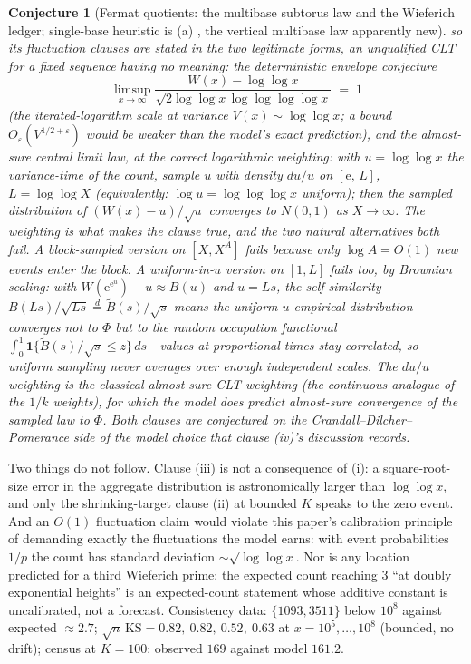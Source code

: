 \documentclass[11pt]{article}
\newtheorem{conjecture}{Conjecture}
\theoremstyle{definition}
\newcommand{\e}{\mathrm{e}}
\begin{document}
\begin{conjecture}[Fermat quotients: the multibase subtorus law and
the Wieferich ledger; single-base heuristic is (a) \cite{CDP}, the
vertical multibase law apparently new]
so its fluctuation clauses are stated in the two legitimate forms,
an unqualified CLT for a fixed sequence having no meaning: the
\emph{deterministic envelope conjecture}
\[
\limsup_{x\to\infty}
\frac{W(x)-\log\log x}
{\sqrt{2\log\log x\,\log\log\log\log x}}\;=\;1
\]
(the iterated-logarithm scale at variance $V(x)\sim\log\log x$; a
bound $O_\varepsilon(V^{1/2+\varepsilon})$ would be weaker than
the model's exact prediction), and the \emph{almost-sure central
limit law, at the correct logarithmic weighting}: with
$u=\log\log x$ the variance-time of the count, sample $u$ with
density $du/u$ on $[\e,\,L]$, $L=\log\log X$ (equivalently: $\log u
=\log\log\log x$ uniform); then the sampled distribution of
$(W(x)-u)/\sqrt u$ converges to $N(0,1)$ as $X\to\infty$.  The
weighting is what makes the clause true, and the two natural
alternatives both fail.  A block-sampled version on $[X,X^A]$
fails because only $\log A=O(1)$ new events enter the block.  A
\emph{uniform}-in-$u$ version on $[1,L]$ fails too, by Brownian
scaling: with
$W(\e^{\e^u})-u\approx B(u)$ and $u=Ls$, the self-similarity
$B(Ls)/\sqrt{Ls}\overset{d}=\widetilde B(s)/\sqrt s$ means the
uniform-$u$ empirical distribution converges not to $\Phi$ but to
the \emph{random} occupation functional
$\int_0^1\mathbf 1\{\widetilde B(s)/\sqrt s\le z\}\,ds$---values at
proportional times stay correlated, so uniform sampling never
averages over enough independent scales.  The $du/u$ weighting is
the classical almost-sure-CLT weighting (the continuous analogue of
the $1/k$ weights), for which the model does predict almost-sure
convergence of the sampled law to $\Phi$.  Both clauses are
conjectured on the
Crandall--Dilcher--Pomerance side of the model choice that clause
(iv)'s discussion records.
\end{conjecture}

Two things do not follow.  Clause (iii) is not a
consequence of (i): a square-root-size error in the aggregate
distribution is astronomically larger than $\log\log x$, and only the
shrinking-target clause (ii) at bounded $K$ speaks to the zero event.
And an $O(1)$ fluctuation claim would violate this paper's calibration
principle of demanding exactly the fluctuations the model earns: with
event probabilities $1/p$ the count has standard deviation
$\sim\sqrt{\log\log x}$.  Nor is any
location predicted for a third Wieferich prime: the expected count
reaching $3$ ``at doubly exponential heights'' is an expected-count
statement whose additive constant is uncalibrated, not a forecast.
Consistency data: $\{1093,3511\}$ below $10^8$ against
expected $\approx2.7$; $\sqrt n\,\mathrm{KS}=0.82,\ 0.82,\ 0.52,\
0.63$ at $x=10^5,\dots,10^8$ (bounded, no drift); census at $K=100$:
observed $169$ against model $161.2$.
\end{document}
